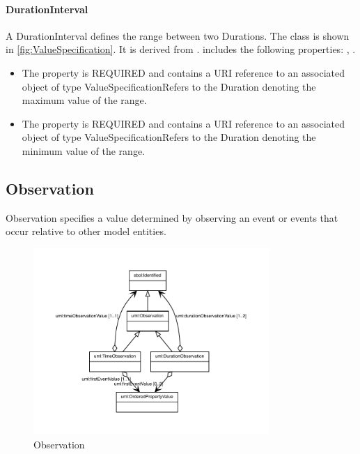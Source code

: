 \paragraph{DurationInterval}%
\label{sec:uml:DurationInterval}%
A DurationInterval defines the range between two Durations.%
\linebreak%
\linebreak%
The  class is shown in \ref{fig:ValueSpecification}. It is derived from .%
 includes the following properties: , . %
\begin{itemize}%
\item%
The  property is REQUIRED and contains a URI reference to an associated object of type ValueSpecificationRefers to the Duration denoting the maximum value of the range.%
\item%
The  property is REQUIRED and contains a URI reference to an associated object of type ValueSpecificationRefers to the Duration denoting the minimum value of the range.%
\end{itemize}%
\subsection{Observation}%
\label{sec:uml:Observation}%
Observation specifies a value determined by observing an event or events that occur relative to other model entities.%
\linebreak%
\linebreak%


\begin{figure}[h!]%
\centering%
\includegraphics[width=0.8\textwidth]{uml_classes/Observation_abstraction_hierarchy.pdf}%
\caption{Observation}%
\label{fig:Observation}%
\end{figure}

